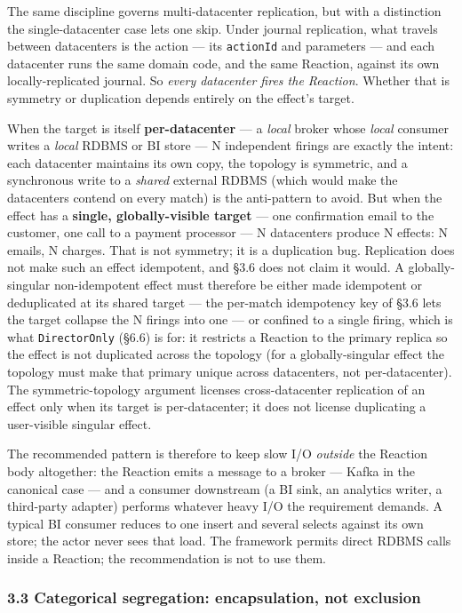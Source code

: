 \documentclass[
]{article}
\let\origtexttt\texttt%
\renewcommand{\texttt}[1]{\origtexttt{\seqsplit{#1}}}%
\let\texttt\origtexttt%
\begin{document}
The same discipline governs multi-datacenter replication, but with a
distinction the single-datacenter case lets one skip. Under journal
replication, what travels between datacenters is the action --- its
\texttt{actionId} and parameters --- and each datacenter runs the same
domain code, and the same Reaction, against its own locally-replicated
journal. So \emph{every datacenter fires the Reaction}. Whether that is
symmetry or duplication depends entirely on the effect's target.

When the target is itself \textbf{per-datacenter} --- a \emph{local}
broker whose \emph{local} consumer writes a \emph{local} RDBMS or BI
store --- N independent firings are exactly the intent: each datacenter
maintains its own copy, the topology is symmetric, and a synchronous
write to a \emph{shared} external RDBMS (which would make the
datacenters contend on every match) is the anti-pattern to avoid. But
when the effect has a \textbf{single, globally-visible target} --- one
confirmation email to the customer, one call to a payment processor ---
N datacenters produce N effects: N emails, N charges. That is not
symmetry; it is a duplication bug. Replication does not make such an
effect idempotent, and §3.6 does not claim it would. A globally-singular
non-idempotent effect must therefore be either made idempotent or
deduplicated at its shared target --- the per-match idempotency key of
§3.6 lets the target collapse the N firings into one --- or confined to
a single firing, which is what \texttt{DirectorOnly} (§6.6) is for: it
restricts a Reaction to the primary replica so the effect is not
duplicated across the topology (for a globally-singular effect the
topology must make that primary unique across datacenters, not
per-datacenter). The symmetric-topology argument licenses
cross-datacenter replication of an effect only when its target is
per-datacenter; it does not license duplicating a user-visible singular
effect.

The recommended pattern is therefore to keep slow I/O \emph{outside} the
Reaction body altogether: the Reaction emits a message to a broker ---
Kafka in the canonical case --- and a consumer downstream (a BI sink, an
analytics writer, a third-party adapter) performs whatever heavy I/O the
requirement demands. A typical BI consumer reduces to one insert and
several selects against its own store; the actor never sees that load.
The framework permits direct RDBMS calls inside a Reaction; the
recommendation is not to use them.

\subsubsection{3.3 Categorical segregation: encapsulation, not
exclusion}\label{categorical-segregation-encapsulation-not-exclusion}
\end{document}
